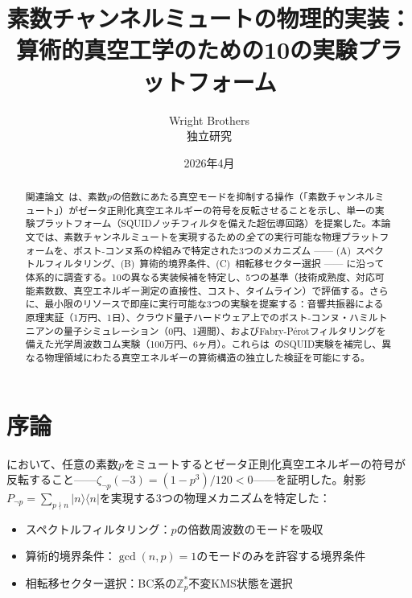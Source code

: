 \documentclass[11pt,a4paper]{article}
\begin{document}
\title{素数チャンネルミュートの物理的実装：\\算術的真空工学のための10の実験プラットフォーム}
\author{Wright Brothers\\{\small 独立研究}}
\date{2026年4月}
\maketitle

\begin{abstract}
関連論文~\cite{paper_A}は、素数$p$の倍数にあたる真空モードを抑制する操作（「素数チャンネルミュート」）がゼータ正則化真空エネルギーの符号を反転させることを示し、単一の実験プラットフォーム（SQUIDノッチフィルタを備えた超伝導回路）を提案した。本論文では、素数チャンネルミュートを実現するための\emph{全て}の実行可能な物理プラットフォームを、ボスト-コンヌ系の枠組みで特定された3つのメカニズム —— (A)~スペクトルフィルタリング、(B)~算術的境界条件、(C)~相転移セクター選択 —— に沿って体系的に調査する。10の異なる実装候補を特定し、5つの基準（技術成熟度、対応可能素数数、真空エネルギー測定の直接性、コスト、タイムライン）で評価する。さらに、最小限のリソースで即座に実行可能な3つの実験を提案する：音響共振器による原理実証（1万円、1日）、クラウド量子ハードウェア上でのボスト-コンヌ・ハミルトニアンの量子シミュレーション（0円、1週間）、およびFabry-P\'{e}rotフィルタリングを備えた光学周波数コム実験（100万円、6ヶ月）。これらは~\cite{paper_A}のSQUID実験を補完し、異なる物理領域にわたる真空エネルギーの算術構造の独立した検証を可能にする。
\end{abstract}

\section{序論}
\label{sec:intro}

\cite{paper_A}において、任意の素数$p$をミュートするとゼータ正則化真空エネルギーの符号が反転すること——$\zeta_{\neg p}(-3) = (1-p^3)/120 < 0$——を証明した。射影$P_{\neg p} = \sum_{p\nmid n}|n\rangle\langle n|$を実現する3つの物理メカニズムを特定した：
\begin{itemize}
\item[(A)] スペクトルフィルタリング：$p$の倍数周波数のモードを吸収
\item[(B)] 算術的境界条件：$\gcd(n,p)=1$のモードのみを許容する境界条件
\item[(C)] 相転移セクター選択：BC系の$\mathbb{Z}_p^*$不変KMS状態を選択
\end{itemize}
\end{document}
